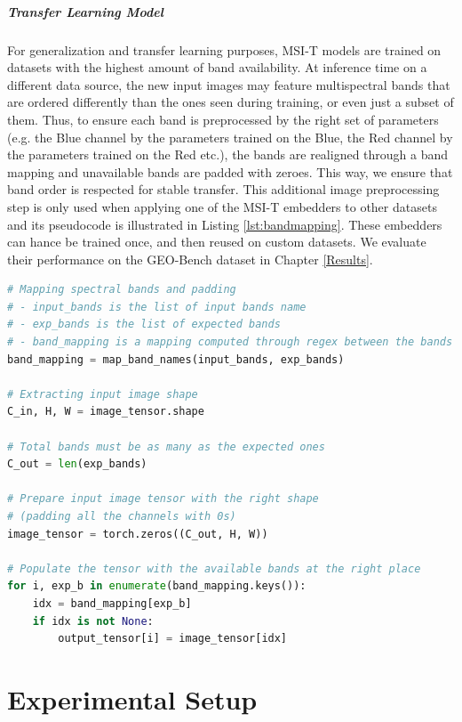 \documentclass[a4paper, oneside, english]{sapthesis} %
\begin{document}
\paragraph{Transfer Learning Model} For generalization and transfer learning purposes, MSI-T models are trained on datasets with the highest amount of band availability. At inference time on a different data source, the new input images may feature multispectral bands that are ordered differently than the ones seen during training, or even just a subset of them. Thus, to ensure each band is preprocessed by the right set of parameters (e.g. the Blue channel by the parameters trained on the Blue, the Red channel by the parameters trained on the Red etc.), the bands are realigned through a band mapping and unavailable bands are padded with zeroes. This way, we ensure that band order is respected for stable transfer. This additional image preprocessing step is only used when applying one of the MSI-T embedders to other datasets and its pseudocode is illustrated in Listing \ref{lst:bandmapping}. These embedders can hance be trained once, and then reused on custom datasets. We evaluate their performance on the GEO-Bench dataset in Chapter \ref{Results}.


\begin{lstlisting}[language=Python, caption={Pseudocode for reordering the multispectral bands of input images and padding with zeroes the missing ones.}, label={lst:bandmapping}]
# Mapping spectral bands and padding
# - input_bands is the list of input bands name
# - exp_bands is the list of expected bands
# - band_mapping is a mapping computed through regex between the bands sets,
band_mapping = map_band_names(input_bands, exp_bands)

# Extracting input image shape
C_in, H, W = image_tensor.shape

# Total bands must be as many as the expected ones
C_out = len(exp_bands)

# Prepare input image tensor with the right shape
# (padding all the channels with 0s)
image_tensor = torch.zeros((C_out, H, W))

# Populate the tensor with the available bands at the right place
for i, exp_b in enumerate(band_mapping.keys()):
    idx = band_mapping[exp_b]
    if idx is not None:
        output_tensor[i] = image_tensor[idx]
\end{lstlisting}



\chapter{Experimental Setup} %
\end{document}
